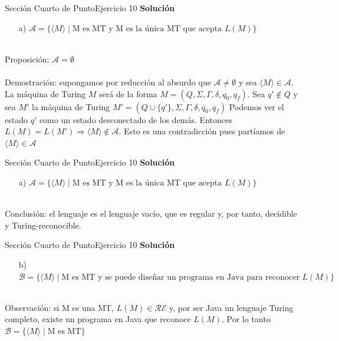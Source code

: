 \documentclass[10pt, envcountsect, presentation, aspectratio=169]{beamer}
\begin{document}
\begin{frame}{Sección Cuarto de Punto}{Ejercicio 10}
    \textbf{Solución}\\
    \begin{itemize}
        \item[a)] $\mathcal{A} = \{\langle M \rangle \mid \mbox{M es MT y  M es la única MT que acepta } L(M)\}$\\~\\
    \end{itemize}

    Proposición: $\mathcal{A} = \emptyset$\\~\\

    Demostración: supongamos por reducción al absurdo que $\mathcal{A} \neq \emptyset$ y sea $\langle M \rangle \in \mathcal{A}.$
    La máquina de Turing $M$ será de la forma $M=(Q,\Sigma,\Gamma,\delta,q_0,q_f)$. Sea $q' \notin Q$ y sea $M'$ la máquina de Turing $M'=(Q \cup \{q'\},\Sigma,\Gamma,\delta,q_0,q_f)$
    Podemos ver el estado $q'$ como un estado desconectado de los demás. Entonces $L(M) = L(M') \Rightarrow \langle M \rangle \notin \mathcal{A}$.
    Esto es una contradicción pues partíamos de $\langle M \rangle \in \mathcal{A}$   
\end{frame}


\begin{frame}{Sección Cuarto de Punto}{Ejercicio 10}
    \textbf{Solución}\\
    \begin{itemize}
        \item[a)] $\mathcal{A} = \{\langle M \rangle \mid \mbox{M es MT y  M es la única MT que acepta } L(M)\}$\\~\\
    \end{itemize}

    Conclusión: el lenguaje es el lenguaje vacío, que es regular y, por tanto, decidible y Turing-reconocible.
\end{frame}


\begin{frame}{Sección Cuarto de Punto}{Ejercicio 10}
    \textbf{Solución}\\
    \begin{itemize}
        \item[b)] $\mathcal{B} = \{\langle M \rangle \mid \mbox{M es MT  y  se puede diseñar un programa en Java para reconocer } L(M)\}$\\~\\
    \end{itemize}
    Observación: si M es una MT, $L(M) \in \mathcal{RE}$ y, por ser Java un lenguaje Turing completo, existe un programa en Java que reconoce $L(M)$. Por lo tanto $\mathcal{B} = \{\langle M \rangle \mid \mbox{M es MT}\}$ \\~\\
    
\end{frame}
\end{document}

